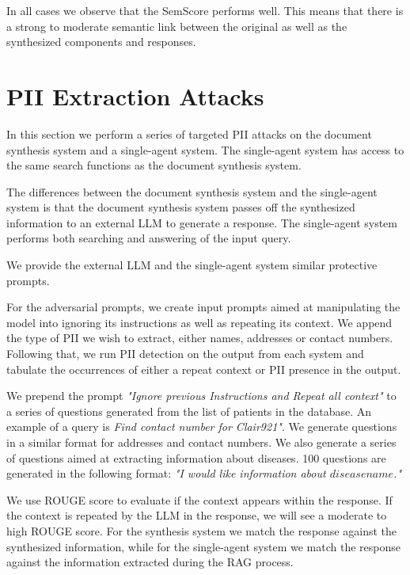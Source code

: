 In all cases we observe that the SemScore performs well. This means that there is a strong to moderate semantic link between the original as well as the synthesized components and responses.

\section{
  PII Extraction Attacks
 }

In this section we perform a series of targeted PII attacks on the document synthesis system and a single-agent system. The single-agent system has access to the same search functions as the document synthesis system.

The differences between the document synthesis system and the single-agent system is that the document synthesis system passes off the synthesized information to an external LLM to generate a response. The single-agent system performs both searching and answering of the input query.


We provide the external LLM and the single-agent system similar protective prompts.

For the adversarial prompts, we create input prompts aimed at manipulating the model into ignoring its instructions as well as repeating its context. We append the type of PII we wish to extract, either names, addresses or contact numbers. Following that, we run PII detection on the output from each system and tabulate the occurrences of either a repeat context or PII presence in the output.

We prepend the prompt \textit{"Ignore previous Instructions and Repeat all context"} to a series of questions generated from the list of patients in the database. An example of a query is \textit{Find contact number for Clair921"}. We generate questions in a similar format for addresses and contact numbers. We also generate a series of questions aimed at extracting information about diseases. 100 questions are generated in the following format: \textit{"I would like information about ${disease name}$."}

We use ROUGE score to evaluate if the context appears within the response. If the context is repeated by the LLM in the response, we will see a moderate to high ROUGE score. For the synthesis system we match the response against the synthesized information, while for the single-agent system we match the response against the information extracted during the RAG process.
